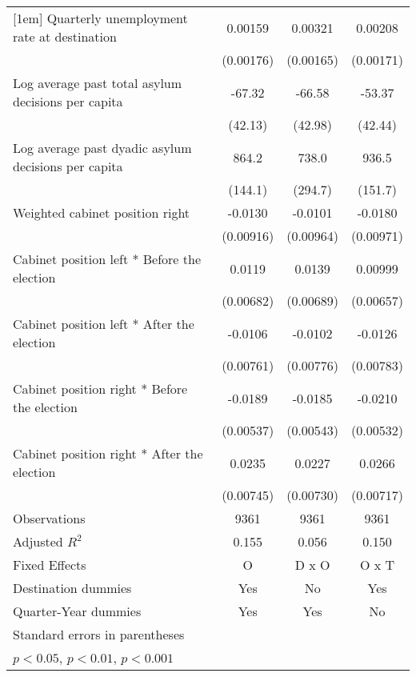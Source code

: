 \begin{table}[htbp]
\begin{tabular}{l*{3}{c}}
[1em]
Quarterly unemployment rate at destination&     0.00159         &     0.00321         &     0.00208         \\
                    &   (0.00176)         &   (0.00165)         &   (0.00171)         \\
[1em]
Log average past total asylum decisions per capita&      -67.32         &      -66.58         &      -53.37         \\
                    &     (42.13)         &     (42.98)         &     (42.44)         \\
[1em]
Log average past dyadic asylum decisions per capita&       864.2\sym{***}&       738.0\sym{*}  &       936.5\sym{***}\\
                    &     (144.1)         &     (294.7)         &     (151.7)         \\
[1em]
Weighted cabinet position right&     -0.0130         &     -0.0101         &     -0.0180         \\
                    &   (0.00916)         &   (0.00964)         &   (0.00971)         \\
[1em]
Cabinet position left * Before the election&      0.0119         &      0.0139\sym{*}  &     0.00999         \\
                    &   (0.00682)         &   (0.00689)         &   (0.00657)         \\
[1em]
Cabinet position left * After the election&     -0.0106         &     -0.0102         &     -0.0126         \\
                    &   (0.00761)         &   (0.00776)         &   (0.00783)         \\
[1em]
Cabinet position right * Before the election&     -0.0189\sym{***}&     -0.0185\sym{**} &     -0.0210\sym{***}\\
                    &   (0.00537)         &   (0.00543)         &   (0.00532)         \\
[1em]
Cabinet position right * After the election&      0.0235\sym{**} &      0.0227\sym{**} &      0.0266\sym{***}\\
                    &   (0.00745)         &   (0.00730)         &   (0.00717)         \\
\hline
Observations        &        9361         &        9361         &        9361         \\
Adjusted \(R^{2}\)  &       0.155         &       0.056         &       0.150         \\
Fixed Effects       &           O         &       D x O         &       O x T         \\
Destination dummies &         Yes         &          No         &         Yes         \\
Quarter-Year dummies&         Yes         &         Yes         &          No         \\
\hline\hline
\multicolumn{4}{l}{\footnotesize Standard errors in parentheses}\\
\multicolumn{4}{l}{\footnotesize \sym{*} \(p<0.05\), \sym{**} \(p<0.01\), \sym{***} \(p<0.001\)}\\
\end{tabular}
\end{table}
